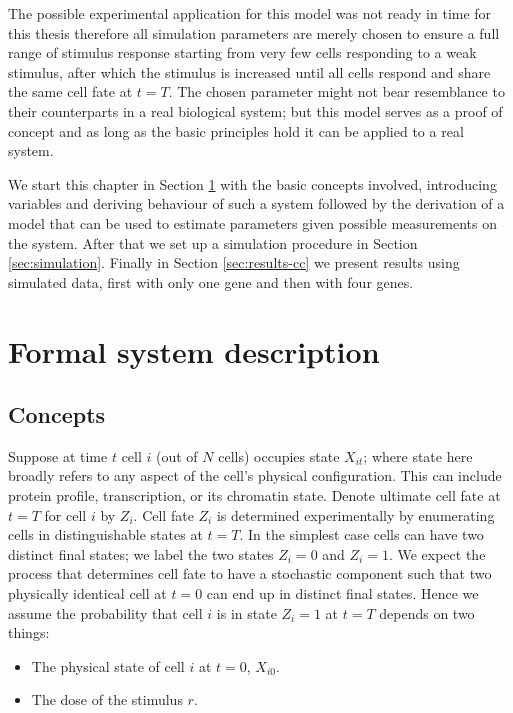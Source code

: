 The possible experimental application for this model was not ready in time for this thesis therefore all simulation parameters are merely chosen to ensure a full range of stimulus response starting from very few cells responding to a weak stimulus, after which the stimulus is increased until all cells respond and share the same cell fate at $t=T$. The chosen parameter might not bear resemblance to their counterparts in a real biological system; but this model serves as a proof of concept and as long as the basic principles hold it can be applied to a real system.

We start this chapter in Section \ref{sec:model-descr} with the basic concepts involved, introducing variables and deriving  behaviour of such a system followed by the derivation of a model that can be used to estimate parameters given possible measurements on the system. After that we set up a simulation procedure in Section \ref{sec:simulation}. Finally in Section \ref{sec:results-cc} we present results using simulated data, first with only one gene and then with four genes.

\section{Formal system description}
\label{sec:model-descr}

\subsection{Concepts}
\label{sec:concepts}


Suppose at time $t$ cell $i$ (out of $N$ cells) occupies state $X_{it}$; where state here broadly refers to any aspect of the cell's physical configuration. This can include protein profile, transcription, or its chromatin state. Denote ultimate cell fate at $t=T$ for cell $i$ by $Z_i$. Cell fate $Z_i$ is determined experimentally by enumerating cells in distinguishable states at $t=T$. In the simplest case cells can have two distinct final states; we label the two states $Z_i = 0$ and $Z_i = 1$. We expect the process that determines cell fate to have a stochastic component such that two physically identical cell at $t=0$ can end up in distinct final states. Hence we assume the probability that cell $i$ is in state $Z_i = 1$ at $t=T$ depends on two things:

\begin{itemize}
\item The physical state of cell $i$ at $t=0$, $X_{i0}$.
\item The dose of the stimulus $r$. 
\end{itemize}


